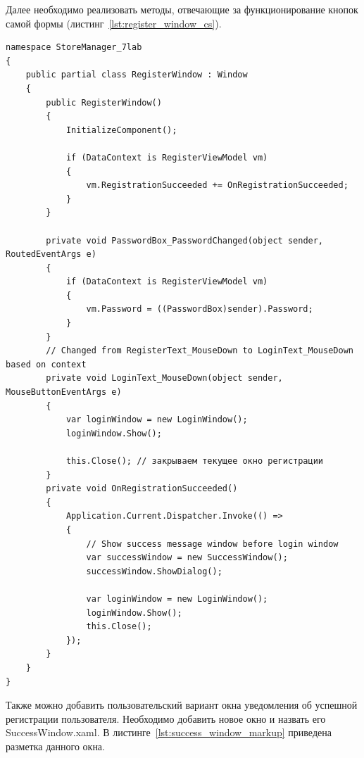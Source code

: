 \documentclass[12pt]{article}
\newcommand{\colorGIT}[1]{\textcolor{CtpLavender}{#1}}
\renewcommand{\texttt}[1]{{\small\ttfamily #1}}
\newenvironment{code}
  {\par\captionsetup{type=listing}\noindent}
  {\par\vspace{\baselineskip}}
\numberwithin{listing}{section}
\numberwithin{figure}{section}
\begin{document}
Далее необходимо реализовать методы, отвечающие за функционирование кнопок самой формы (листинг~\ref{lst:register_window_cs}).
\begin{code}
	\begin{verbatim}
namespace StoreManager_7lab
{
    public partial class RegisterWindow : Window
    {
        public RegisterWindow()
        {
            InitializeComponent();

            if (DataContext is RegisterViewModel vm)
            {
                vm.RegistrationSucceeded += OnRegistrationSucceeded;
            }
        }

        private void PasswordBox_PasswordChanged(object sender, RoutedEventArgs e)
        {
            if (DataContext is RegisterViewModel vm)
            {
                vm.Password = ((PasswordBox)sender).Password;
            }
        }
        // Changed from RegisterText_MouseDown to LoginText_MouseDown based on context
        private void LoginText_MouseDown(object sender, MouseButtonEventArgs e) 
        {
            var loginWindow = new LoginWindow();
            loginWindow.Show();

            this.Close(); // закрываем текущее окно регистрации
        }
        private void OnRegistrationSucceeded()
        {
            Application.Current.Dispatcher.Invoke(() =>
            {
                // Show success message window before login window
                var successWindow = new SuccessWindow();
                successWindow.ShowDialog();

                var loginWindow = new LoginWindow();
                loginWindow.Show();
                this.Close();
            });
        }
    }
}
\end{verbatim}
	\caption{Методы формы регистрации (\colorGIT{\href{https://github.com/WebMasterIT/Csharp_Labs/blob/main/7_lab_WPF/StoreManager_7lab/StoreManager_7lab/RegisterWindow.xaml.cs}{\texttt{RegisterWindow.xaml.cs}}})}
	\label{lst:register_window_cs}
\end{code}

Также можно добавить пользовательский вариант окна уведомления об успешной регистрации пользователя.
Необходимо добавить новое окно и назвать его \texttt{SuccessWindow.xaml}.
В листинге~\ref{lst:success_window_markup} приведена разметка данного окна.
\end{document}

